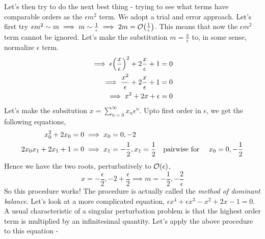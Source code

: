 \documentclass[a4paper,11pt]{article}
\begin{document}
Let's then try to do the next best thing - trying to see what terms have comparable orders as the $ \epsilon m^2 $ term. We adopt a trial and error approach. Let's first try $ \epsilon m^2 \sim m \implies m \sim \frac{1}{\epsilon} \implies 2m  = \order{\frac{1}{\epsilon}} $. This means that now the $ \epsilon m^2 $ term cannot be ignored. Let's make the substitution $ m = \frac{x}{\epsilon}$ to, in some sense, normalize $ \epsilon  $ term.
\begin{align*}
\implies \epsilon \qty(\dfrac{x}{\epsilon})^2 + 2 \dfrac{x}{\epsilon} + 1 = 0 \\
\implies \dfrac{x^2}{\epsilon} + 2 \dfrac{x}{\epsilon} + 1 = 0 \\
\implies x^2 + 2 x + \epsilon = 0
\end{align*}
Let's make the subsitution $  x = \sum_{n=0}^{\infty} x_n \epsilon^n$. Upto first order in $ \epsilon $, we get the following equations,
\begin{align*}
x_0^2 + 2 x_0 = 0 &\implies x_0 = 0 , -2 \\
2 x_0 x_1 + 2 x_1 + 1 = 0 &\implies x_1 = -\dfrac{1}{2}, x_1 = \dfrac{1}{2} \qq{pairwise for } x_0= 0 , -\frac{1}{2}
\end{align*}
Hence we have the two roots, perturbatively to $ \order{\epsilon} $,
\begin{equation*}
x = -\dfrac{\epsilon}{2}, -2 + \dfrac{\epsilon}{2} \implies m = -\dfrac{1}{2}, -\dfrac{2}{\epsilon}
\end{equation*}
So this procedure works! The procedure is actually called the \textit{method of dominant balance}. Let's look at a more complicated equation, $ \epsilon x^4 + \epsilon x^3 - x^2 + 2x - 1 =0 $. A usual characteristic of a singular perturbation problem is that the highest order term is multiplied by an infinitesimal quantity. Let's apply the above procedure to this equation -
\end{document}
